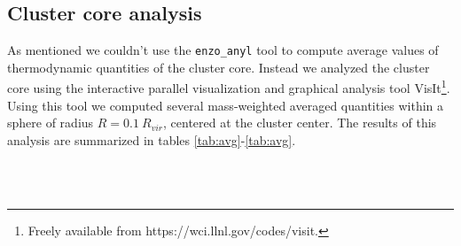 \subsection{Cluster core analysis}
As mentioned we couldn't use the \texttt{enzo\_anyl} tool to compute average
values of
thermodynamic quantities of the cluster core. Instead we analyzed the cluster
core using the interactive parallel visualization and graphical analysis tool
VisIt\footnote{Freely available from https://wci.llnl.gov/codes/visit.}. Using
this tool we computed several mass-weighted averaged quantities within a sphere
of radius $R=0.1\ R_{vir}$, centered at the cluster center. The results of this
analysis are summarized in tables
\ref{tab:avg}-\ref{tab:avg}.
\begin{table}[tp]
\begin{center}
\begin{small}
\\
\\
\end{small}
\end{center}
\caption{Mass weighted values of some quantities, calculated
within a sphere with $R = 0.1\ R_{vir}$ centred at the cluster center at
z=0.}
\label{tab:avg}
\end{table}
